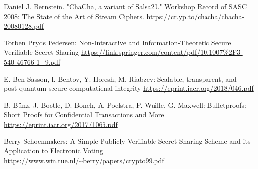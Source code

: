 \documentclass[a4paper,11pt]{article}
\begin{document}
\begin{thebibliography}{999}
	Daniel J. Bernstein. "ChaCha, a variant of Salsa20." Workshop Record of SASC 2008: The State of the Art of Stream Ciphers. \url{https://cr.yp.to/chacha/chacha-20080128.pdf}

	Torben Pryds Pedersen: Non-Interactive and Information-Theoretic Secure Verifiable Secret Sharing \url{https://link.springer.com/content/pdf/10.1007%2F3-540-46766-1_9.pdf}

	E. Ben-Sasson, I. Bentov, Y. Horesh, M. Riabzev: Scalable, transparent, and post-quantum secure computational integrity \url{https://eprint.iacr.org/2018/046.pdf}
	
	B. Bünz, J. Bootle, D. Boneh, A. Poelstra, P. Wuille, G. Maxwell: Bulletproofs: Short Proofs for Confidential Transactions and More \url{https://eprint.iacr.org/2017/1066.pdf}

	Berry Schoenmakers: A Simple Publicly Verifiable Secret Sharing
Scheme and its Application to Electronic Voting \url{https://www.win.tue.nl/~berry/papers/crypto99.pdf}
	
\end{thebibliography}
\end{document}
